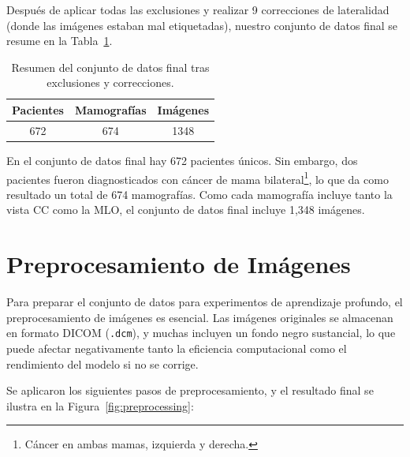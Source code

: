 \documentclass[a4paper,10pt]{book}
\begin{document}
Después de aplicar todas las exclusiones y realizar 9 correcciones de lateralidad (donde las imágenes estaban mal etiquetadas), nuestro conjunto de datos final se resume en la Tabla~\ref{tab:final_dataset_overview}.

\begin{table}[h!]
\caption[Resumen del conjunto de datos final]{Resumen del conjunto de datos final tras exclusiones y correcciones.}
\centering
\begin{tabular}{c c c}
\toprule
\textbf{Pacientes} & \textbf{Mamografías} & \textbf{Imágenes} \\
\midrule
672 & 674 & 1348 \\
\bottomrule
\end{tabular}
\label{tab:final_dataset_overview}
\end{table}

En el conjunto de datos final hay 672 pacientes únicos. Sin embargo, dos pacientes fueron diagnosticados con cáncer de mama bilateral\footnote{Cáncer en ambas mamas, izquierda y derecha.}, lo que da como resultado un total de 674 mamografías. Como cada mamografía incluye tanto la vista CC como la MLO, el conjunto de datos final incluye 1,348 imágenes.

\section{Preprocesamiento de Imágenes}

Para preparar el conjunto de datos para experimentos de aprendizaje profundo, el preprocesamiento de imágenes es esencial. Las imágenes originales se almacenan en formato DICOM (\texttt{.dcm}), y muchas incluyen un fondo negro sustancial, lo que puede afectar negativamente tanto la eficiencia computacional como el rendimiento del modelo si no se corrige.

Se aplicaron los siguientes pasos de preprocesamiento, y el resultado final se ilustra en la Figura~\ref{fig:preprocessing}:
\end{document}
